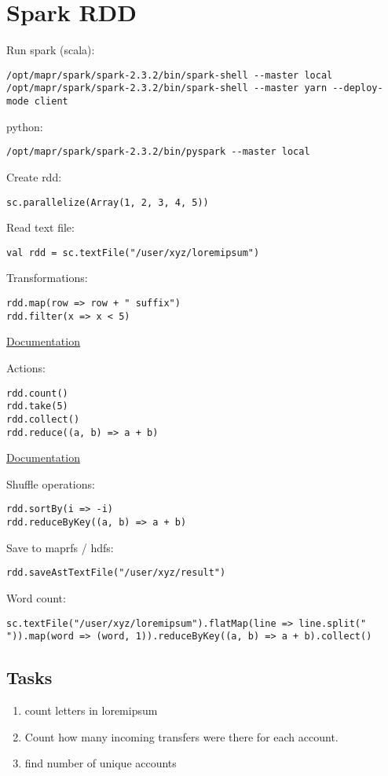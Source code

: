 \documentclass{article}
\begin{document}
\section*{Spark RDD}

Run spark (scala):
\begin{lstlisting}[]
/opt/mapr/spark/spark-2.3.2/bin/spark-shell --master local
/opt/mapr/spark/spark-2.3.2/bin/spark-shell --master yarn --deploy-mode client
\end{lstlisting}

python:
\begin{lstlisting}[]
/opt/mapr/spark/spark-2.3.2/bin/pyspark --master local
\end{lstlisting}

Create rdd:
\begin{lstlisting}[]
sc.parallelize(Array(1, 2, 3, 4, 5))
\end{lstlisting}

Read text file:
\begin{lstlisting}[]
val rdd = sc.textFile("/user/xyz/loremipsum")
\end{lstlisting}

Transformations:
\begin{lstlisting}[]
rdd.map(row => row + " suffix")
rdd.filter(x => x < 5)
\end{lstlisting}
\href{https://spark.apache.org/docs/latest/rdd-programming-guide.html#transformations}{Documentation}

Actions:
\begin{lstlisting}[]
rdd.count()
rdd.take(5)
rdd.collect()
rdd.reduce((a, b) => a + b)
\end{lstlisting}
\href{https://spark.apache.org/docs/latest/rdd-programming-guide.html#actions}{Documentation}

Shuffle operations:
\begin{lstlisting}[]
rdd.sortBy(i => -i)
rdd.reduceByKey((a, b) => a + b)
\end{lstlisting}

Save to maprfs / hdfs:
\begin{lstlisting}[]
rdd.saveAstTextFile("/user/xyz/result")
\end{lstlisting}

Word count:
\begin{lstlisting}[]
sc.textFile("/user/xyz/loremipsum").flatMap(line => line.split(" ")).map(word => (word, 1)).reduceByKey((a, b) => a + b).collect()
\end{lstlisting}

\subsection*{Tasks}

\begin{enumerate}
\item count letters in loremipsum
\item Count how many incoming transfers were there for each account.
\item find number of unique accounts
\end{enumerate}
\end{document}
